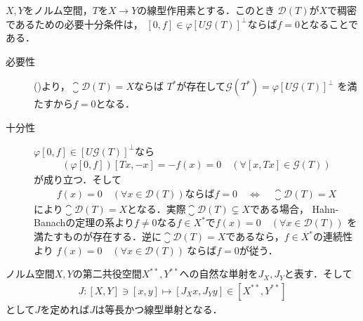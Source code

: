 	\begin{screen}
		\begin{lem}[定義域が稠密となるための条件]
			$X,Y$をノルム空間，$T$を$X \rightarrow Y$の線型作用素とする．このとき
			$\mathscr{D}(T)$が$X$で稠密であるための必要十分条件は，
			$[0,f] \in \varphi\left[U\mathscr{G}(T) \right]^{\perp}$ならば$f = 0$となることである．
		\end{lem}
	\end{screen}
		
	\begin{prf}\mbox{}
		\begin{description}
			\item[必要性]
				()より，$\closure{\mathscr{D}(T)}  = X$ならば
				$T^*$が存在して$\mathscr{G}(T^*) = \varphi\left[U\mathscr{G}(T) \right]^{\perp}$
				を満たすから$f = 0$となる．
			
			\item[十分性]
				$\varphi[0,f] \in \left[U\mathscr{G}(T) \right]^{\perp}$なら
				\begin{align}
					\left( \varphi[0,f] \right)[Tx,-x] = -f(x) = 0 \quad (\forall [x,Tx] \in \mathscr{G}(T))
				\end{align}
				が成り立つ．そして
				\begin{align}
					f(x) = 0 \quad (\forall x \in \mathscr{D}(T)) \mbox{ならば$f=0$} \quad \Leftrightarrow \quad \closure{\mathscr{D}(T)} = X
				\end{align}
				により$\closure{\mathscr{D}(T)}  = X$となる．実際$\closure{\mathscr{D}(T)} \subsetneq X$である場合，
				Hahn-Banachの定理の系より$f \neq 0$なる$f \in X^*$で$f(x) = 0 \quad (\forall x \in \mathscr{D}(T))$
				を満たすものが存在する．逆に$\closure{\mathscr{D}(T)} = X$であるなら，$f \in X^*$の連続性より
				$f(x) = 0 \quad (\forall x \in \mathscr{D}(T))\ $ならば$f=0$が従う．
		\end{description}
		\QED
	\end{prf}
	
	ノルム空間$X,Y$の第二共役空間$X^{**},Y^{**}$への自然な単射を$J_X,J_Y$と表す．そして
	\begin{align}
		J:[X,Y] \ni [x,y] \longmapsto [J_Xx,J_Yy] \in [X^{**},Y^{**}]
	\end{align}
	として$J$を定めれば$J$は等長かつ線型単射となる．
	
